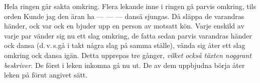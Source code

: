 Hela ringen går sakta omkring. Flera lekande inne i ringen gå parvis omkring, tils orden \guillemotright{}Kunde jag den äran ha — — — dansä\guillemotright{} sjungas. Då släppa de varandras händer, ock var ock en bjuder upp en person av motsatt kön. Varje enskild av varje par vänder sig nu ett slag omkring, de fatta sedan parvis varandras händer ock dansa (d.\,v.\,s.\@ gå i takt några slag på samma ställe), vända sig åter ett slag omkring ock dansa igän. Detta upprepas tre gånger, \textit{vilket också täxten noggrant beskriver}. De först i leken inkomna gå nu ut. De av dem uppbjudna börja åter leken på förut angivet sätt.